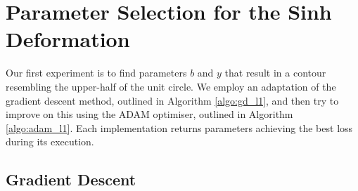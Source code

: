 \documentclass[a4paper]{report}
\begin{document}
\section{Parameter Selection for the Sinh Deformation}
Our first experiment is to find parameters $b$ and $y$ that result in a contour resembling the upper-half of the unit circle. We employ an adaptation of the gradient descent method, outlined in Algorithm \ref{algo:gd_l1}, and then try to improve on this using the ADAM optimiser, outlined in Algorithm \ref{algo:adam_l1}. Each implementation returns parameters achieving the best loss during its execution.

\subsection{Gradient Descent}
\end{document}
